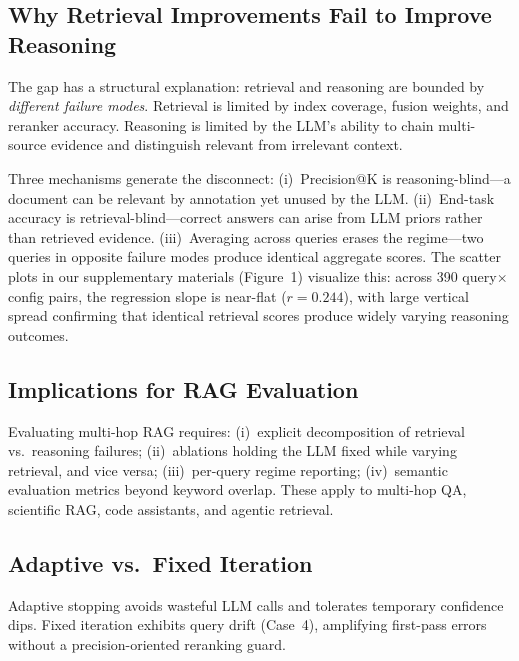 \documentclass[11pt,a4paper]{article}
\begin{document}
\subsection{Why Retrieval Improvements Fail to Improve Reasoning}

The gap has a structural explanation: retrieval and reasoning are
bounded by \emph{different failure modes}.
Retrieval is limited by index coverage, fusion weights, and reranker
accuracy.
Reasoning is limited by the LLM's ability to chain multi-source
evidence and distinguish relevant from irrelevant context.

Three mechanisms generate the disconnect:
(i)~Precision@K is reasoning-blind---a document can be relevant by
annotation yet unused by the LLM.
(ii)~End-task accuracy is retrieval-blind---correct answers can arise
from LLM priors rather than retrieved evidence.
(iii)~Averaging across queries erases the regime---two queries in
opposite failure modes produce identical aggregate scores.
The scatter plots in our supplementary materials (Figure~1) visualize
this: across 390 query$\times$config pairs, the regression slope is
near-flat ($r{=}0.244$), with large vertical spread confirming that
identical retrieval scores produce widely varying reasoning outcomes.

\subsection{Implications for RAG Evaluation}

Evaluating multi-hop RAG requires:
(i)~explicit decomposition of retrieval vs.\ reasoning failures;
(ii)~ablations holding the LLM fixed while varying retrieval, and
vice versa;
(iii)~per-query regime reporting;
(iv)~semantic evaluation metrics beyond keyword overlap.
These apply to multi-hop QA, scientific RAG, code assistants, and
agentic retrieval.

\subsection{Adaptive vs.\ Fixed Iteration}

Adaptive stopping avoids wasteful LLM calls and tolerates temporary
confidence dips.
Fixed iteration exhibits query drift (Case~4), amplifying first-pass
errors without a precision-oriented reranking guard.

\end{document}
